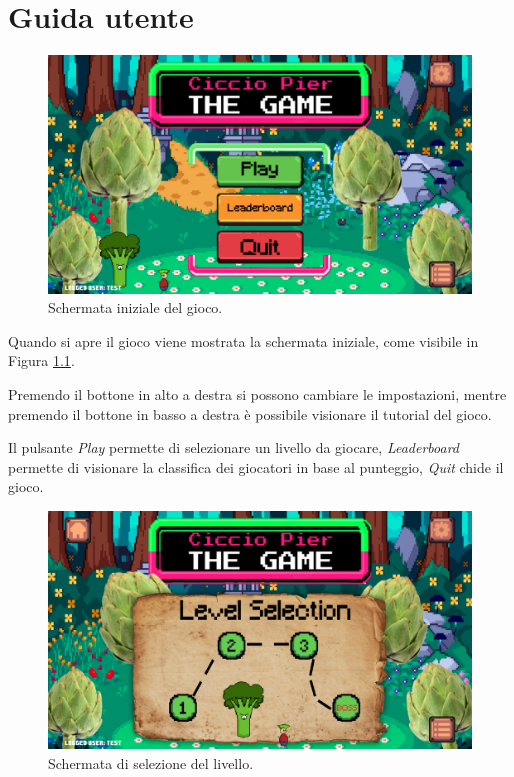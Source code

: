 \documentclass[a4paper,12pt]{report}
\begin{document}
\appendix
\chapter{Guida utente}

\begin{figure}[H]
\centering{}
\includegraphics[scale=0.2] {img/game-menu.png}
\caption{Schermata iniziale del gioco.}
\label{img:game-menu}
\end{figure}

Quando si apre il gioco viene mostrata la schermata iniziale, come visibile in Figura \ref{img:game-menu}.

Premendo il bottone in alto a destra si possono cambiare le impostazioni, mentre premendo il bottone in basso a destra è possibile visionare il tutorial del gioco.

Il pulsante \emph{Play} permette di selezionare un livello da giocare, \emph{Leaderboard} permette di visionare la classifica dei giocatori in base al punteggio, \emph{Quit} chide il gioco.

\begin{figure}[H]
\centering{}
\includegraphics[scale=0.2] {img/game-selection.png}
\caption{Schermata di selezione del livello.}
\label{img:game-selection}
\end{figure}
\end{document}
